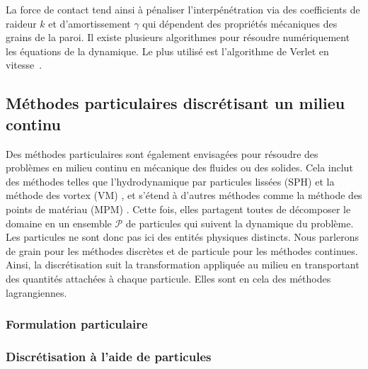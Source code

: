 La force de contact tend ainsi à pénaliser l'interpénétration via des coefficients de raideur $k$ et d'amortissement $\gamma$ qui dépendent des propriétés mécaniques des grains de la paroi. Il existe plusieurs algorithmes pour résoudre numériquement les équations de la dynamique. Le plus utilisé est l'algorithme de Verlet en vitesse~\cite{verlet_1982}.


\subsection{Méthodes particulaires discrétisant un milieu continu}\label{sec:part_cont}

Des méthodes particulaires sont également envisagées pour résoudre des problèmes en milieu continu en mécanique des fluides ou des solides. Cela inclut des méthodes telles que l'hydrodynamique par particules lissées (SPH) \cite{lucy_1977,gingold_monaghan_sph_1977} et la méthode des vortex (VM) \cite{cottet_vortex_2000}, et s'étend à d'autres méthodes comme la méthode des points de matériau (MPM) \cite{sulsky_particle_1994}. Cette fois, elles partagent toutes de décomposer le domaine en un ensemble $\mathcal{P}$ de particules qui suivent la dynamique du problème. Les particules ne sont donc pas ici des entités physiques distincts. Nous parlerons de grain pour les méthodes discrètes et de particule pour les méthodes continues. Ainsi, la discrétisation suit la transformation appliquée au milieu en transportant des quantités attachées à chaque particule. Elles sont en cela des méthodes lagrangiennes.

\subsubsection{Formulation particulaire}

\subsubsection{Discrétisation à l'aide de particules}


